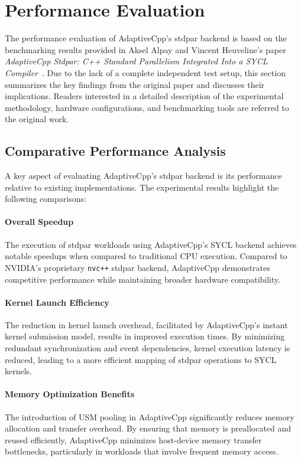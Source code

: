 \section{Performance Evaluation}
\label{sec:performance_evaluation}

The performance evaluation of AdaptiveCpp’s stdpar backend is based on the benchmarking results provided in
Aksel Alpay and Vincent Heuveline’s paper \textit{AdaptiveCpp Stdpar: C++ Standard Parallelism Integrated Into
a SYCL Compiler}~\cite{alpay2021}. Due to the lack of a complete independent test setup, this section summarizes
the key findings from the original paper and discusses their implications. Readers interested in a detailed
description of the experimental methodology, hardware configurations, and benchmarking tools are referred to
the original work.

\subsection{Comparative Performance Analysis}
\label{sec:comparative_performance}

A key aspect of evaluating AdaptiveCpp’s stdpar backend is its performance relative to existing implementations.
The experimental results highlight the following comparisons:

\paragraph{Overall Speedup}
The execution of stdpar workloads using AdaptiveCpp’s SYCL backend achieves notable speedups when compared
to traditional CPU execution. Compared to NVIDIA’s proprietary \texttt{nvc++} stdpar backend, AdaptiveCpp
demonstrates competitive performance while maintaining broader hardware compatibility.

\paragraph{Kernel Launch Efficiency}
The reduction in kernel launch overhead, facilitated by AdaptiveCpp’s instant kernel submission model, results
in improved execution times. By minimizing redundant synchronization and event dependencies, kernel execution
latency is reduced, leading to a more efficient mapping of stdpar operations to SYCL kernels.

\paragraph{Memory Optimization Benefits}
The introduction of USM pooling in AdaptiveCpp significantly reduces memory allocation and transfer overhead.
By ensuring that memory is preallocated and reused efficiently, AdaptiveCpp minimizes host-device memory
transfer bottlenecks, particularly in workloads that involve frequent memory access.

